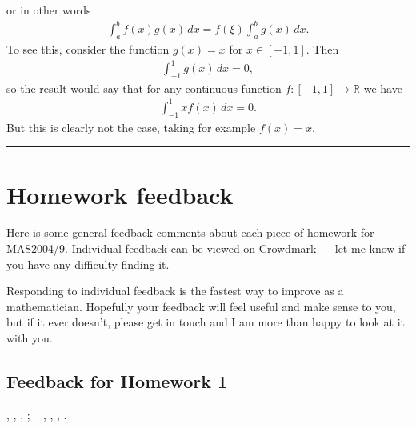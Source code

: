 \documentclass[letterpaper,10pt,english]{jupyterBook}
\begin{document}
\sphinxAtStartPar
or in other words
\begin{equation*}
\begin{split}
\int_a^b f(x)g(x)\, dx = f(\xi ) \int_a^b g(x)\, dx .
\end{split}
\end{equation*}
\sphinxAtStartPar
{} To see this, consider the function \(g(x) = x\) for \(x\in [-1,1]\). Then
\begin{equation*}
\begin{split}
\int_{-1}^1 g(x)\, dx =0,
\end{split}
\end{equation*}
\sphinxAtStartPar
so the result would say that for any continuous function \(f\colon [-1,1]\rightarrow \mathbb{R}\) we have
\begin{equation*}
\begin{split}
\int_{-1}^1 xf(x)\, dx =0.
\end{split}
\end{equation*}
\sphinxAtStartPar
But this is clearly not the case, taking for example \(f(x)=x\).


\bigskip\hrule\bigskip


\sphinxstepscope


\section{Homework feedback}
\label{\detokenize{HW-feedback:homework-feedback}}\label{\detokenize{HW-feedback:hw-feedback}}\label{\detokenize{HW-feedback::doc}}
\sphinxAtStartPar
Here is some general feedback comments about each piece of homework for MAS2004/9. Individual feedback can be viewed on Crowdmark — let me know if you have any difficulty finding it.

\sphinxAtStartPar
Responding to individual feedback is the fastest way to improve as a mathematician. Hopefully your feedback will feel useful and make sense to you, but if it ever doesn’t, please get in touch and I am more than happy to look at it with you.


\subsection{Feedback for Homework 1}
\label{\detokenize{HW-feedback:feedback-for-homework-1}}
\sphinxAtStartPar
{} {\hyperref[\detokenize{Problems:p2}]{}}, {\hyperref[\detokenize{Problems:p3}]{}}, {\hyperref[\detokenize{Problems:id2}]{}}, {\hyperref[\detokenize{Problems:id3}]{}};   {\hyperref[\detokenize{Solutions-full:p2sol}]{}}, {\hyperref[\detokenize{Solutions-full:p3sol}]{}}, {\hyperref[\detokenize{Solutions-full:id1}]{}}, {\hyperref[\detokenize{Solutions-full:id2}]{}}.
\end{document}
